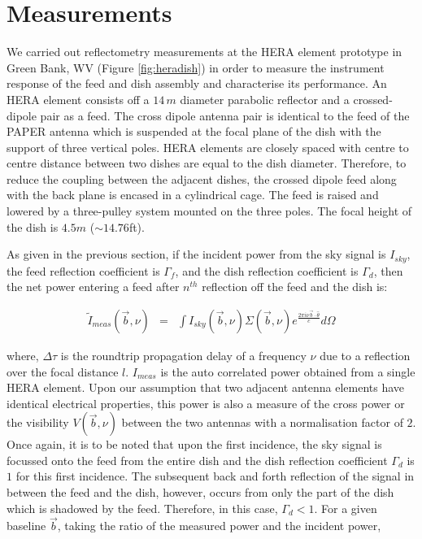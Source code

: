\documentclass[iop]{emulateapj}
\newcommand{\vis}{{V}}
\newcommand{\thhat}{{\hat\theta}}
\newcommand{\fngexp}{{e^{\frac{2\pi i\nu\vec{b}\cdot\thhat}{c}}}}
\begin{document}
\section{Measurements}
We carried out reflectometry measurements at the HERA element prototype in Green
Bank, WV (Figure \ref{fig:heradish}) in order to measure the instrument response of the feed and dish assembly and characterise its performance. An HERA element consists off a $14\,m$ diameter
parabolic reflector and a crossed-dipole pair as a feed. The cross dipole antenna pair is identical to the feed of the PAPER antenna which is suspended at the focal plane of the dish with the support of three vertical poles. HERA elements are closely spaced with centre to centre distance between two dishes are equal to the dish diameter. Therefore, to reduce the coupling between the adjacent dishes, the crossed dipole feed along with the back plane is encased in a cylindrical cage. The feed is raised and
lowered by a three-pulley system mounted on the three poles. The focal height of the dish is $4.5m$
($\sim{14.76}$ft).  




As given in the previous section, if the incident power from the sky signal is $I_{sky}$, the feed
reflection coefficient is $\Gamma_{f}$, and the dish reflection
coefficient is $\Gamma_{d}$, then the net power entering a feed after
$n^{th}$ reflection off the feed and the dish is:

\begin{eqnarray}
\tilde I_{meas}(\vec b, \nu) & = & \int I_{sky}(\vec b, \nu)\Sigma(\vec b, \nu) \fngexp d\Omega
\end{eqnarray}



where, $\Delta \tau$ is the roundtrip propagation delay of a frequency $\nu$ due to a reflection over the focal distance $l$. $I_{meas}$ is the auto correlated power obtained from a single HERA element. Upon our assumption that two adjacent antenna elements have identical electrical properties, this power is also a measure of the cross power or the visibility $\vis (\vec b, \nu)$ between the two antennas with a normalisation factor of $2$. Once again, it is to be noted that upon the first incidence, the sky signal is focussed onto the feed from the entire dish and the dish reflection coefficient $\Gamma_{d}$ is $1$ for this first incidence. The subsequent back and forth reflection of the signal in between the feed and the dish, however, occurs from only the part of the dish which is shadowed by the feed. Therefore, in this case, $\Gamma_{d} < 1$. For a given baseline $\vec b$, taking the ratio of the measured power and the incident power, 
\end{document}
